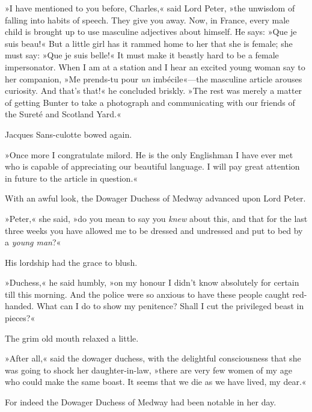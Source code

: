 »I have mentioned to you before, Charles,« said Lord Peter, »the unwisdom of falling into habits of speech. They give you away. Now, in France, every male child is brought up to use masculine adjectives about himself. He says: »Que je suis beau!« But a little girl has it rammed home to her that she is female; she must say: »Que je suis belle!« It must make it beastly hard to be a female impersonator. When I am at a station and I hear an excited young woman say to her companion, »Me prends-tu pour \textit{un} imbécile«—the masculine article arouses curiosity. And that's that!« he concluded briskly. »The rest was merely a matter of getting Bunter to take a photograph and communicating with our friends of the Sureté and Scotland Yard.«

Jacques Sans-culotte bowed again.

»Once more I congratulate milord. He is the only Englishman I have ever met who is capable of appreciating our beautiful language. I will pay great attention in future to the article in question.«

With an awful look, the Dowager Duchess of Medway advanced upon Lord Peter.

»Peter,« she said, »do you mean to say you \textit{knew} about this, and that for the last three weeks you have allowed me to be dressed and undressed and put to bed by a \textit{young man}?«

His lordship had the grace to blush.

»Duchess,« he said humbly, »on my honour I didn't know absolutely for certain till this morning. And the police were so anxious to have these people caught red-handed. What can I do to show my penitence? Shall I cut the privileged beast in pieces?«

The grim old mouth relaxed a little.

»After all,« said the dowager duchess, with the delightful consciousness that she was going to shock her daughter-in-law, »there are very few women of my age who could make the same boast. It seems that we die as we have lived, my dear.«

For indeed the Dowager Duchess of Medway had been notable in her day.
